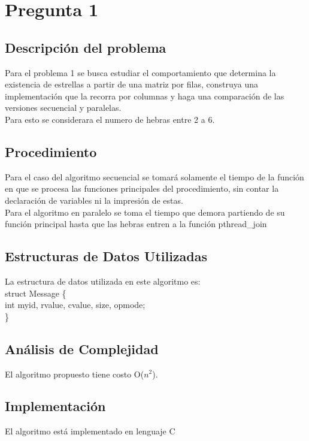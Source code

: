 \documentclass{report}
\newcommand \minitab{\hspace*{15 pt}}
\begin{document}
\section{Pregunta 1}
\subsection{Descripci\'on del problema}
Para el problema 1 se busca estudiar el comportamiento que determina la existencia de estrellas a partir de una matriz
por filas, construya una implementación que la recorra por columnas y haga una comparación de las versiones secuencial y paralelas.\\
Para esto se considerara el numero de hebras entre 2 a 6.

%
\subsection{Procedimiento}

Para el caso del algoritmo secuencial se tomará solamente el tiempo de la función en que se procesa las funciones principales del procedimiento, sin contar la declaración de variables ni la impresión de estas. \\
Para el algoritmo en paralelo se toma el tiempo que demora partiendo de su función principal hasta que las hebras entren a la función pthread\_join 

%
\subsection{Estructuras de Datos Utilizadas}
La estructura de datos utilizada en este algoritmo es:\\

struct Message \{\\
   \minitab int myid, rvalue, cvalue, size, opmode;\\
\}



\subsection{An\'alisis de Complejidad}
El algoritmo propuesto tiene costo O($n^2$).
%

\subsection{Implementaci\'on}
El algoritmo est\'a implementado en lenguaje C

\newpage
\end{document}
